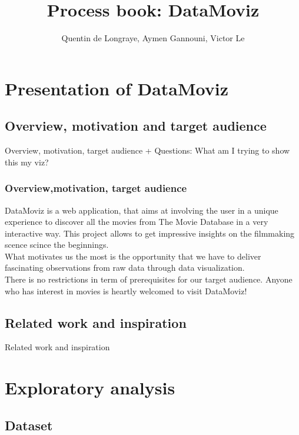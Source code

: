 \documentclass[a4paper,10pt]{article}
\begin{document}
\title{Process book: DataMoviz}
\author{Quentin de Longraye, Aymen Gannouni, Victor Le}

\maketitle

\tableofcontents

\newpage

\section{Presentation of DataMoviz}

\subsection{Overview, motivation and target audience}
Overview, motivation, target audience
+ Questions: What am I trying to show this my viz?
\subsubsection*{Overview,motivation, target audience}
DataMoviz is a web application, that aims at involving the user in a unique experience to discover all the movies from The Movie Database in a very interactive way. This project allows to get impressive insights on the filmmaking scence scince the beginnings.\\
What motivates us the most is the opportunity that we have to deliver fascinating observations from raw data through data visualization.\\
There is no restrictions in term of prerequisites for our target audience. Anyone who has interest in movies is heartly welcomed to visit DataMoviz!
\subsection{Related work and inspiration}

Related work and inspiration

\section{Exploratory analysis}

\subsection{Dataset}
\end{document}
